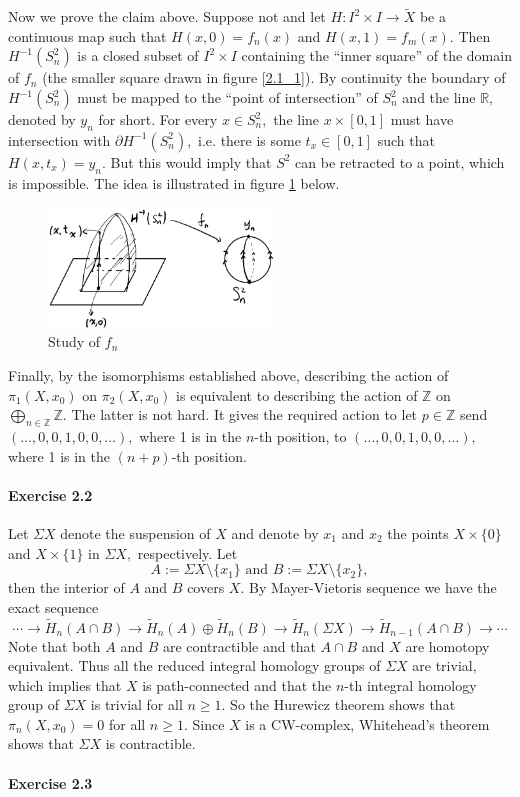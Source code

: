 \documentclass{article}
\begin{document}
Now we prove the claim above. Suppose not and let $H\colon I^2\times I\rightarrow \widetilde{X}$ be a continuous map such that $H(x,0)=f_n(x)$ and $H(x,1)=f_m(x).$ Then $H^{-1}(S_n^2)$ is a closed subset of $I^2\times I$ containing the
``inner square'' of the domain of $f_n$ (the smaller square drawn in figure \ref{2.1_1}). By continuity the boundary of $H^{-1}(S_n^2)$ must be mapped to the ``point of intersection'' of $S_n^2$ and the line $\mathbb{R},$ denoted by $y_n$ for short. For every $x\in S_n^2,$ the line $x\times[0,1]$ must have intersection with $\partial H^{-1}(S_n^2),$ i.e. there is some $t_x\in[0,1]$ such that $H(x,t_x)=y_n.$ But this would imply that $S^2$ can be retracted to a point, which is impossible. The idea is illustrated in figure \ref{2.1_3} below.

\begin{figure}[ht]
  \centering
  \includegraphics[width=6cm]{2.1_3.png}
  \caption{Study of $f_n$}\label{2.1_3}
\end{figure}


Finally, by the isomorphisms established above, describing the action of $\pi_1(X,x_0)$ on $\pi_2(X,x_0)$ is equivalent to describing the action of $\mathbb{Z}$ on $\bigoplus_{n\in\mathbb{Z}}\mathbb{Z}.$ The latter is not hard. It gives the required action to let $p\in\mathbb{Z}$ send $(\ldots,0,0,1,0,0,\ldots),$ where 1 is in the $n$-th position, to $(\ldots,0,0,1,0,0,\ldots),$ where 1 is in the $(n+p)$-th position.

\paragraph{Exercise 2.2}Let $\Sigma X$ denote the suspension of $X$ and denote by $x_1$ and $x_2$ the points $X\times\{0\}$ and $X\times\{1\}$ in $\Sigma X, $ respectively. Let
\[A:=\Sigma X\setminus \{x_1\}\text{ and }B:=\Sigma X\setminus \{x_2\},\]
then the interior of $A$ and $B$ covers $X.$ By Mayer-Vietoris sequence we have the exact sequence
\[\cdots\rightarrow \widetilde{H}_n(A\cap B)\rightarrow \widetilde{H}_n(A)\oplus \widetilde{H}_n(B)\rightarrow \widetilde{H}_n(\Sigma X)\rightarrow \widetilde{H}_{n-1}(A\cap B)\rightarrow\cdots\]
Note that both $A$ and $B$ are contractible and that $A\cap B$ and $X$ are homotopy equivalent. Thus all the reduced integral homology groups of $\Sigma X$ are trivial, which implies that $X$ is path-connected and that the $n$-th integral homology group of $\Sigma X$ is trivial for all $n\geq 1.$ So the Hurewicz theorem shows that $\pi_n(X,x_0)=0$ for all $n\geq1.$ Since $X$ is a CW-complex, Whitehead's theorem shows that $\Sigma X$ is contractible.

\paragraph{Exercise 2.3}
\end{document}
